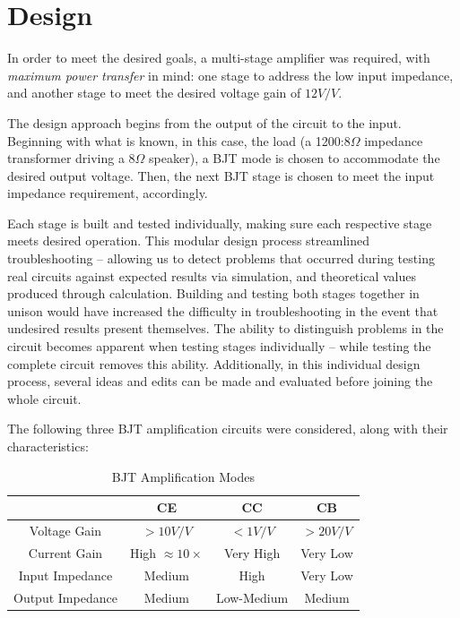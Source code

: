 \documentclass[12pt]{article}
\begin{document}
\section{Design}
In order to meet the desired goals, a multi-stage amplifier was required, with \textit{maximum power transfer} in mind: one stage to address the low input impedance, and another stage to meet the desired voltage gain of $12V/V$.

The design approach begins from the output of the circuit to the input. Beginning with what is known, in this case, the load (a 1200:8$\Omega$ impedance transformer driving a 8$\Omega$ speaker), a BJT mode is chosen to accommodate the desired output voltage. Then, the next BJT stage is chosen to meet the input impedance requirement, accordingly.

Each stage is built and tested individually, making sure each respective stage meets desired operation. This modular design process streamlined troubleshooting -- allowing us to detect problems that occurred during testing real circuits against expected results via simulation, and theoretical values produced through calculation. Building and testing both stages together in unison would have increased the difficulty in troubleshooting in the event that undesired results present themselves. The ability to distinguish problems in the circuit becomes apparent when testing stages individually -- while testing the complete circuit removes this ability. Additionally, in this individual design process, several ideas and edits can be made and evaluated before joining the whole circuit.

The following three BJT amplification circuits were considered, along with their characteristics:


\begin{table}[htb]
    \caption{BJT Amplification Modes}
    \centering
    \begin{tabular}{c c c c}
        \toprule
                        & CE              & CC            & CB            \\
        \midrule
        Voltage Gain    &  \( > 10 V/V\)  & \( <1 V/V\)   & \( >20 V/V\)  \\
        Current Gain    & High \( \approx 10 \times\) & Very High     & Very Low  \\
        Input Impedance &  Medium         & High   & Very Low  \\
        Output Impedance    &  Medium  & Low-Medium   & Medium  \\
        \bottomrule
    \end{tabular}
    \label{tbl:1}
\end{table}
\end{document}
